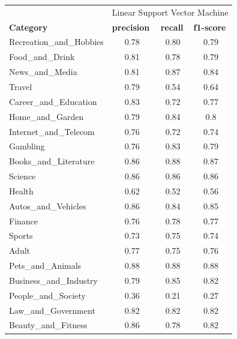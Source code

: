 \begin{enumerate}
    \begin{table}[H]
        \centering
        \begin{tabular}{l|c|c|c|}
            \hline
            \multicolumn{1}{c}{}  & \multicolumn{3}{|c|}{Linear Support Vector Machine}\\\cline{2-4}
            \textbf{Category} & \multicolumn{1}{l|}{\textbf{precision}} & \multicolumn{1}{l|}{\textbf{recall}} & \multicolumn{1}{l|}{\textbf{f1-score}} \\ \hline
            Recreation\_and\_Hobbies & 0.78 & 0.80 & 0.79 \\ \cline{2-4} 
            Food\_and\_Drink &  0.81 & 0.78 & 0.79\\ \cline{2-4} 
            News\_and\_Media &  0.81 & 0.87 & 0.84  \\ \cline{2-4} 
            Travel & 0.79 & 0.54 & 0.64  \\ \cline{2-4} 
            Career\_and\_Education & 0.83 & 0.72 & 0.77 \\ \cline{2-4} 
            Home\_and\_Garden & 0.79 & 0.84 & 0.8 \\ \cline{2-4} 
            Internet\_and\_Telecom & 0.76 & 0.72 & 0.74 \\ \cline{2-4} 
            Gambling & 0.76 & 0.83 & 0.79 \\ \cline{2-4} 
            Books\_and\_Literature & 0.86 & 0.88 & 0.87  \\ \cline{2-4} 
            Science & 0.86 & 0.86 & 0.86 \\ \cline{2-4} 
            Health & 0.62 & 0.52 & 0.56 \\ \cline{2-4} 
            Autos\_and\_Vehicles & 0.86 & 0.84 & 0.85 \\ \cline{2-4} 
            Finance & 0.76 & 0.78 & 0.77 \\ \cline{2-4} 
            Sports &  0.73 & 0.75 & 0.74 \\ \cline{2-4} 
            Adult & 0.77 & 0.75 & 0.76 \\ \cline{2-4} 
            Pets\_and\_Animals & 0.88 & 0.88 & 0.88 \\ \cline{2-4} 
            Business\_and\_Industry & 0.79 & 0.85 & 0.82 \\ \cline{2-4} 
            People\_and\_Society & 0.36 & 0.21 & 0.27 \\ \cline{2-4} 
            Law\_and\_Government & 0.82 & 0.82 & 0.82 \\ \cline{2-4} 
            Beauty\_and\_Fitness & 0.86 & 0.78 & 0.82  \\ \cline{2-4} 

\end{tabular}
\end{table}
\end{enumerate}
